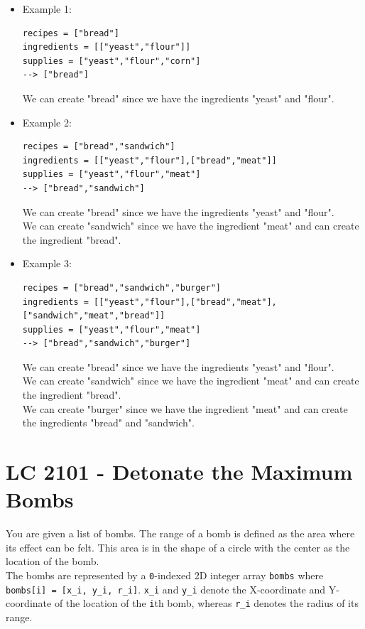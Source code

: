 \begin{itemize}
\item Example 1:
\begin{lstlisting}
recipes = ["bread"]
ingredients = [["yeast","flour"]]
supplies = ["yeast","flour","corn"]
--> ["bread"]
\end{lstlisting}
We can create "bread" since we have the ingredients "yeast" and "flour".
\item Example 2:
\begin{lstlisting}
recipes = ["bread","sandwich"]
ingredients = [["yeast","flour"],["bread","meat"]]
supplies = ["yeast","flour","meat"]
--> ["bread","sandwich"]
\end{lstlisting}
We can create "bread" since we have the ingredients "yeast" and "flour".\\
We can create "sandwich" since we have the ingredient "meat" and can create the ingredient "bread".
\item Example 3:
\begin{lstlisting}
recipes = ["bread","sandwich","burger"]
ingredients = [["yeast","flour"],["bread","meat"],["sandwich","meat","bread"]]
supplies = ["yeast","flour","meat"]
--> ["bread","sandwich","burger"]
\end{lstlisting}
We can create "bread" since we have the ingredients "yeast" and "flour".\\
We can create "sandwich" since we have the ingredient "meat" and can create the ingredient "bread".\\
We can create "burger" since we have the ingredient "meat" and can create the ingredients "bread" and "sandwich".
\end{itemize}

\section{LC 2101 - Detonate the Maximum Bombs}
You are given a list of bombs. The range of a bomb is defined as the area where its effect can be felt. This area is in the shape of a circle with the center as the location of the bomb.\\

The bombs are represented by a {\colorbox{CodeBackground}{\lstinline|0|}}-indexed 2D integer array {\colorbox{CodeBackground}{\lstinline|bombs|}} where {\colorbox{CodeBackground}{\lstinline|bombs[i] = [x_i, y_i, r_i]|}}. {\colorbox{CodeBackground}{\lstinline|x_i|}} and {\colorbox{CodeBackground}{\lstinline|y_i|}} denote the X-coordinate and Y-coordinate of the location of the {\colorbox{CodeBackground}{\lstinline|i|}}th bomb, whereas {\colorbox{CodeBackground}{\lstinline|r_i|}} denotes the radius of its range.\\

